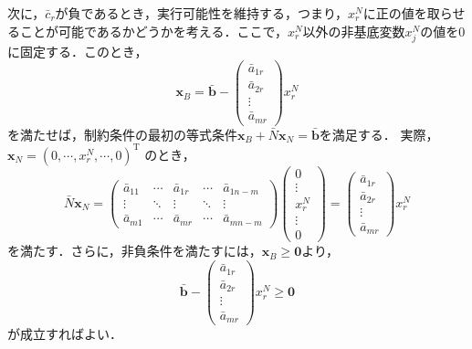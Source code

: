 \documentclass{jsreport}
\begin{document}
次に，$\bar{c}_r$が負であるとき，実行可能性を維持する，つまり，$x_r^N$に正の値を取らせることが可能であるかどうかを考える．ここで，$x_r^N$以外の非基底変数$x_j^N$の値を0に固定する．このとき，
\begin{equation}
  \bm{x}_B = \bar{\bm{b}} -
  \left(
  \begin{array}{c}
    \bar{a}_{1r} \\
    \bar{a}_{2r} \\
    \vdots \\
    \bar{a}_{mr}
  \end{array}
  \right)x_r^N
\end{equation}
を満たせば，制約条件の最初の等式条件$\bm{x}_B + \bar{N}\bm{x}_N = \bar{\bm{b}}$を満足する．
実際，$\bm{x}_N = \left(0, \cdots, x_r^N, \cdots, 0 \right)^{\mathrm{T}}$
のとき，
\begin{equation}
  \bar{N} \bm{x}_N = \left(
  \begin{array}{ccccc}
    \bar{a}_{11} & \cdots & \bar{a}_{1r} & \cdots & \bar{a}_{1 n-m} \\
    \vdots & \ddots & \vdots & \ddots & \vdots \\
    \bar{a}_{m1} & \cdots & \bar{a}_{mr} & \cdots & \bar{a}_{m n-m}
  \end{array}
  \right) \left(
  \begin{array}{c}
    0 \\
    \vdots \\
    x_r^N \\
    \vdots \\
    0
  \end{array}
  \right) = \left(
  \begin{array}{c}
    \bar{a}_{1r} \\
    \bar{a}_{2r} \\
    \vdots \\
    \bar{a}_{mr}
  \end{array}
  \right)x_r^N \nonumber
\end{equation}
を満たす．さらに，非負条件を満たすには，$\bm{x}_B \geq \bm{0}$より，
\begin{equation}\label{eq:notminus}
  \bar{\bm{b}} -
  \left(
  \begin{array}{c}
    \bar{a}_{1r} \\
    \bar{a}_{2r} \\
    \vdots \\
    \bar{a}_{mr}
  \end{array}
  \right)x_r^N \geq \bm{0}
\end{equation}
が成立すればよい．
\end{document}

